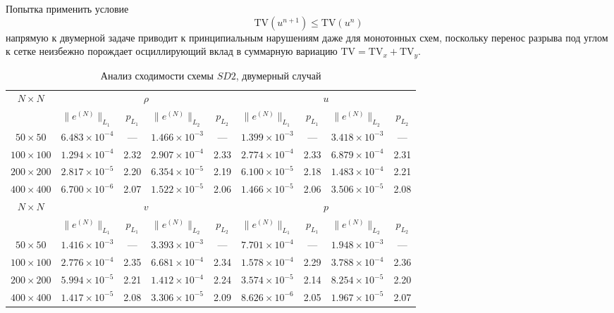 \documentclass[a4paper,14pt]{extarticle}
\theoremstyle{theorem}
\theoremstyle{lemma}
\begin{document}
Попытка применить условие 
\begin{equation}
    \mathrm{TV}(u^{n+1}) \leq \mathrm{TV}(u^n)
\end{equation}
напрямую к двумерной задаче приводит к принципиальным нарушениям даже для
монотонных схем, поскольку перенос разрыва под углом к сетке неизбежно
порождает осциллирующий вклад в суммарную вариацию $\mathrm{TV} = \mathrm{TV}_x + \mathrm{TV}_y$.


\begin{table}[H]
\centering
\fontsize{13pt}{15.6pt}\selectfont
\setlength{\tabcolsep}{4pt}
\caption{Анализ сходимости схемы $SD2$, двумерный случай}
\vspace{0.1cm}
\label{tab:conv_sd2_2d}
\begin{tabular}{c|cccc|cccc}
\toprule
\multirow{2}{*}{$N \times N$}
  & \multicolumn{4}{c}{$\rho$}
  & \multicolumn{4}{c}{$u$} \\
\cmidrule(lr){2-5}\cmidrule(lr){6-9}
  & $\|e^{(N)}\|_{L_1}$ & $p_{L_1}$
  & $\|e^{(N)}\|_{L_2}$ & $p_{L_2}$
  & $\|e^{(N)}\|_{L_1}$ & $p_{L_1}$
  & $\|e^{(N)}\|_{L_2}$ & $p_{L_2}$ \\
\midrule
$50{\times}50$  & $6.483\times10^{-4}$ & --- & $1.466\times10^{-3}$ & --- & $1.399\times10^{-3}$ & --- & $3.418\times10^{-3}$ & --- \\
$100{\times}100$ & $1.294\times10^{-4}$ & 2.32 & $2.907\times10^{-4}$ & 2.33 & $2.774\times10^{-4}$ & 2.33 & $6.879\times10^{-4}$ & 2.31 \\
$200{\times}200$ & $2.817\times10^{-5}$ & 2.20 & $6.354\times10^{-5}$ & 2.19 & $6.100\times10^{-5}$ & 2.18 & $1.483\times10^{-4}$ & 2.21 \\
$400{\times}400$ & $6.700\times10^{-6}$ & 2.07 & $1.522\times10^{-5}$ & 2.06 & $1.466\times10^{-5}$ & 2.06 & $3.506\times10^{-5}$ & 2.08 \\
\midrule
\multirow{2}{*}{$N \times N$}
  & \multicolumn{4}{c}{$v$}
  & \multicolumn{4}{c}{$p$} \\
\cmidrule(lr){2-5}\cmidrule(lr){6-9}
  & $\|e^{(N)}\|_{L_1}$ & $p_{L_1}$
  & $\|e^{(N)}\|_{L_2}$ & $p_{L_2}$
  & $\|e^{(N)}\|_{L_1}$ & $p_{L_1}$
  & $\|e^{(N)}\|_{L_2}$ & $p_{L_2}$ \\
\midrule
$50{\times}50$  & $1.416\times10^{-3}$ & --- & $3.393\times10^{-3}$ & --- & $7.701\times10^{-4}$ & --- & $1.948\times10^{-3}$ & --- \\
$100{\times}100$ & $2.776\times10^{-4}$ & 2.35 & $6.681\times10^{-4}$ & 2.34 & $1.578\times10^{-4}$ & 2.29 & $3.788\times10^{-4}$ & 2.36 \\
$200{\times}200$ & $5.994\times10^{-5}$ & 2.21 & $1.412\times10^{-4}$ & 2.24 & $3.574\times10^{-5}$ & 2.14 & $8.254\times10^{-5}$ & 2.20 \\
$400{\times}400$ & $1.417\times10^{-5}$ & 2.08 & $3.306\times10^{-5}$ & 2.09 & $8.626\times10^{-6}$ & 2.05 & $1.967\times10^{-5}$ & 2.07 \\
\bottomrule
\end{tabular}
\end{table}
\end{document}
